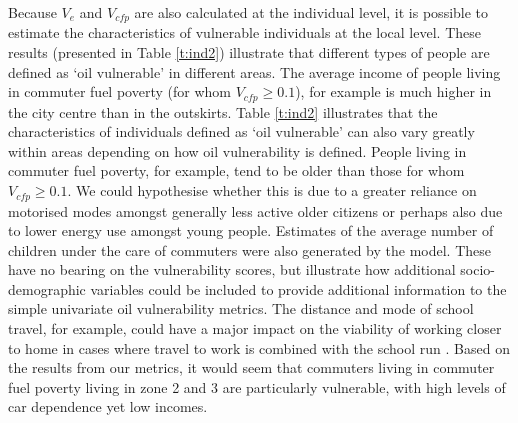 \documentclass[a4paper, 11pt, twoside]{Thesis}
\begin{document}
Because $V_e$ and $V_{cfp}$ are also calculated at the individual level,
it is possible to estimate the characteristics of vulnerable individuals
at the local level. These results (presented in Table \ref{t:ind2})
illustrate that different types of people are defined as `oil vulnerable'
in different areas. The average income of people living in commuter fuel
poverty (for whom $V_{cfp} \geq 0.1$), for example is much higher in the
city centre than in the outskirts. Table \ref{t:ind2} illustrates that
the characteristics of individuals defined as `oil vulnerable' can also
vary greatly within areas depending on how oil vulnerability is defined.
People living in commuter fuel poverty, for example, tend to be older
than those for whom $V_{cfp} \geq 0.1$. We could hypothesise
whether this is due to a greater reliance
on motorised modes amongst generally less active older citizens or
perhaps also due to lower energy use amongst young people.
Estimates of the average number of children
under the care of commuters were also generated by the model.
These have no bearing on the vulnerability scores, but
illustrate how additional socio-demographic variables could be included to
provide additional information to the simple univariate oil vulnerability
metrics. The distance and mode of school travel, for example, could have a
major impact on the viability of working closer to home in cases where
travel to work is combined with the school run \citep{Hensher2000-chaining}.
Based on the results
from our metrics, it would seem that commuters living in
commuter fuel poverty living in zone 2 and 3 are particularly vulnerable,
with high levels of car dependence yet low incomes.
\end{document}
